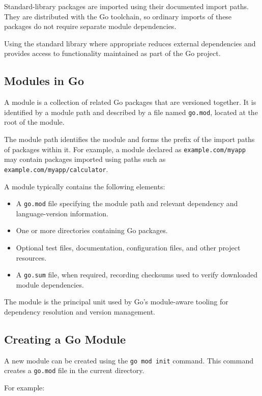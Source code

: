 Standard-library packages are imported using their documented import paths. They are distributed with the Go toolchain, so ordinary imports of these packages do not require separate module dependencies.

Using the standard library where appropriate reduces external dependencies and provides access to functionality maintained as part of the Go project.

\subsection{Modules in Go}

A module is a collection of related Go packages that are versioned together. It is identified by a module path and described by a file named \texttt{go.mod}, located at the root of the module.

The module path identifies the module and forms the prefix of the import paths of packages within it. For example, a module declared as \texttt{example.com/myapp} may contain packages imported using paths such as \texttt{example.com/myapp/calculator}.

A module typically contains the following elements:

\begin{itemize}
    \item A \texttt{go.mod} file specifying the module path and relevant dependency and language-version information.
    \item One or more directories containing Go packages.
    \item Optional test files, documentation, configuration files, and other project resources.
    \item A \texttt{go.sum} file, when required, recording checksums used to verify downloaded module dependencies.
\end{itemize}

The module is the principal unit used by Go's module-aware tooling for dependency resolution and version management.

\subsection{Creating a Go Module}

A new module can be created using the \texttt{go mod init} command. This command creates a \texttt{go.mod} file in the current directory.

For example:

